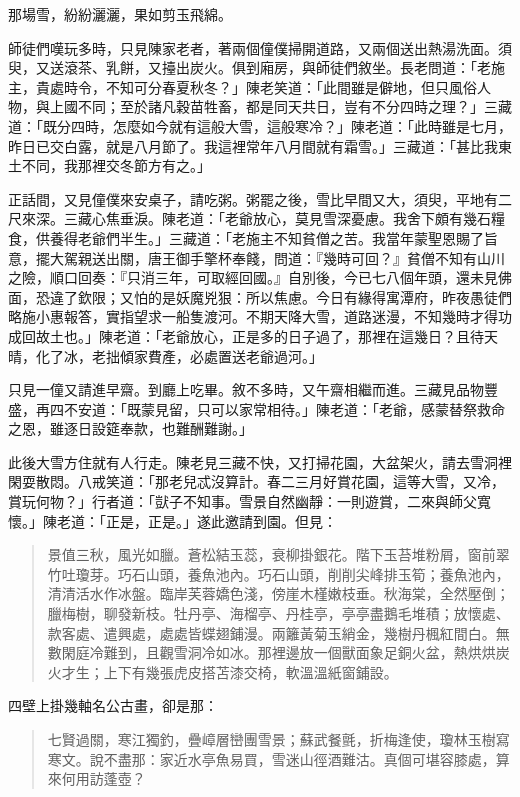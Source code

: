 那場雪，紛紛灑灑，果如剪玉飛綿。

師徒們嘆玩多時，只見陳家老者，著兩個僮僕掃開道路，又兩個送出熱湯洗面。須臾，又送滾茶、乳餅，又擡出炭火。俱到廂房，與師徒們敘坐。長老問道：「老施主，貴處時令，不知可分春夏秋冬？」陳老笑道：「此間雖是僻地，但只風俗人物，與上國不同；至於諸凡穀苗牲畜，都是同天共日，豈有不分四時之理？」三藏道：「既分四時，怎麼如今就有這般大雪，這般寒冷？」陳老道：「此時雖是七月，昨日已交白露，就是八月節了。我這裡常年八月間就有霜雪。」三藏道：「甚比我東土不同，我那裡交冬節方有之。」

正話間，又見僮僕來安桌子，請吃粥。粥罷之後，雪比早間又大，須臾，平地有二尺來深。三藏心焦垂淚。陳老道：「老爺放心，莫見雪深憂慮。我舍下頗有幾石糧食，供養得老爺們半生。」三藏道：「老施主不知貧僧之苦。我當年蒙聖恩賜了旨意，擺大駕親送出關，唐王御手擎杯奉餞，問道：『幾時可回？』貧僧不知有山川之險，順口回奏：『只消三年，可取經回國。』自別後，今已七八個年頭，還未見佛面，恐違了欽限；又怕的是妖魔兇狠：所以焦慮。今日有緣得寓潭府，昨夜愚徒們略施小惠報答，實指望求一船隻渡河。不期天降大雪，道路迷漫，不知幾時才得功成回故土也。」陳老道：「老爺放心，正是多的日子過了，那裡在這幾日？且待天晴，化了冰，老拙傾家費產，必處置送老爺過河。」

只見一僮又請進早齋。到廳上吃畢。敘不多時，又午齋相繼而進。三藏見品物豐盛，再四不安道：「既蒙見留，只可以家常相待。」陳老道：「老爺，感蒙替祭救命之恩，雖逐日設筵奉款，也難酬難謝。」

此後大雪方住就有人行走。陳老見三藏不快，又打掃花園，大盆架火，請去雪洞裡閑耍散悶。八戒笑道：「那老兒忒沒算計。春二三月好賞花園，這等大雪，又冷，賞玩何物？」行者道：「獃子不知事。雪景自然幽靜：一則遊賞，二來與師父寬懷。」陳老道：「正是，正是。」遂此邀請到園。但見：
\begin{quote}
景值三秋，風光如臘。蒼松結玉蕊，衰柳掛銀花。階下玉苔堆粉屑，窗前翠竹吐瓊芽。巧石山頭，養魚池內。巧石山頭，削削尖峰排玉筍；養魚池內，清清活水作冰盤。臨岸芙蓉嬌色淺，傍崖木槿嫩枝垂。秋海棠，全然壓倒；臘梅樹，聊發新枝。牡丹亭、海榴亭、丹桂亭，亭亭盡鵝毛堆積；放懷處、款客處、遣興處，處處皆蝶翅鋪漫。兩籬黃菊玉綃金，幾樹丹楓紅間白。無數閑庭冷難到，且觀雪洞冷如冰。那裡邊放一個獸面象足銅火盆，熱烘烘炭火才生；上下有幾張虎皮搭苫漆交椅，軟溫溫紙窗鋪設。
\end{quote}

四壁上掛幾軸名公古畫，卻是那：
\begin{quote}
七賢過關，寒江獨釣，疊嶂層巒團雪景；蘇武餐氈，折梅逢使，瓊林玉樹寫寒文。說不盡那：家近水亭魚易買，雪迷山徑酒難沽。真個可堪容膝處，算來何用訪蓬壺？
\end{quote}

